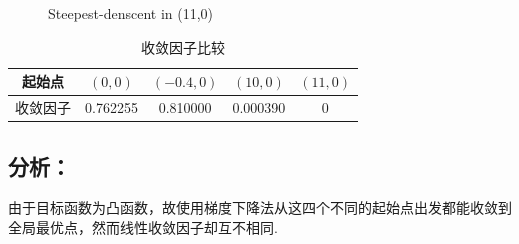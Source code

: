 \begin{figure}[H]
\centering
{}

\caption{Steepest-denscent in (11,0)}
\label{Fig.lable}
\end{figure}

\begin{table}[H]
\centering
\caption{收敛因子比较}
	\begin{tabular}{ccccc}
	\toprule
	{起始点}&$(0,0)$&$(-0.4,0)$&$(10,0)$&$(11,0)$\\
	\midrule
	{收敛因子}&0.762255&0.810000&0.000390&0\\
	\bottomrule
	\end{tabular}
\end{table}

\subsection*{分析：}
由于目标函数为凸函数，故使用梯度下降法从这四个不同的起始点出发都能收敛到全局最优点，然而线性收敛因子却互不相同.


